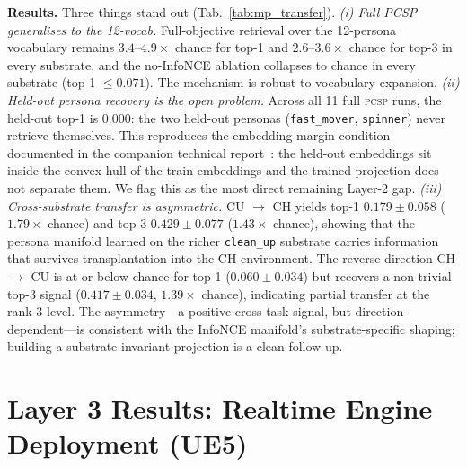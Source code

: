 \documentclass[conference]{IEEEtran}
\newcommand{\PCSP}{\textsc{pcsp}\xspace}
\begin{document}
\noindent\textbf{Results.}
Three things stand out (Tab.~\ref{tab:mp_transfer}). \emph{(i) Full PCSP
generalises to the 12-vocab.} Full-objective retrieval over the
12-persona vocabulary remains $3.4$--$4.9\times$ chance for top-1 and
$2.6$--$3.6\times$ chance for top-3 in every substrate, and the no-InfoNCE
ablation collapses to chance in every substrate (top-1 $\le 0.071$). The
mechanism is robust to vocabulary expansion. \emph{(ii) Held-out persona
recovery is the open problem.} Across all 11 full \PCSP{} runs, the held-out
top-1 is $0.000$: the two held-out personas (\texttt{fast\_mover},
\texttt{spinner}) never retrieve themselves. This reproduces the embedding-margin
condition documented in the companion technical report~\cite{phase5report}:
the held-out embeddings sit inside the convex hull of the train
embeddings and the trained projection does not separate them. We flag this
as the most direct remaining Layer-2 gap. \emph{(iii) Cross-substrate
transfer is asymmetric.} CU $\to$ CH yields top-1 $0.179\!\pm\!0.058$
($1.79\times$ chance) and top-3 $0.429\!\pm\!0.077$ ($1.43\times$ chance),
showing that the persona manifold learned on the richer \texttt{clean\_up}
substrate carries information that survives transplantation into the CH
environment. The reverse direction CH $\to$ CU is at-or-below chance for
top-1 ($0.060\!\pm\!0.034$) but recovers a non-trivial top-3 signal
($0.417\!\pm\!0.034$, $1.39\times$ chance), indicating partial transfer at
the rank-3 level. The asymmetry---a positive cross-task signal, but
direction-dependent---is consistent with the InfoNCE manifold's
substrate-specific shaping; building a substrate-invariant projection is a
clean follow-up.


\section{Layer 3 Results: Realtime Engine Deployment (UE5)}
\label{sec:ue5}
\end{document}
